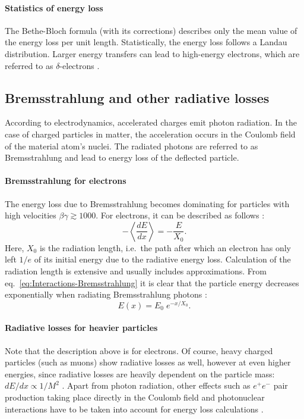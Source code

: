 \paragraph{Statistics of energy loss}
The Bethe-Bloch formula (with its corrections) describes only the mean value of the energy loss per unit length. Statistically, the energy loss follows a Landau distribution. Larger energy transfers can lead to high-energy electrons, which are referred to as $\delta$-electrons \cite{Book-KolanoskiWermes,PDG2024}.

\subsection{Bremsstrahlung and other radiative losses}
\label{sec:Interactions-Bremsstrahlung}
According to electrodynamics, accelerated charges emit photon radiation. In the case of charged particles in matter, the acceleration occurs in the Coulomb field of the material atom's nuclei. The radiated photons are referred to as Bremsstrahlung and lead to energy loss of the deflected particle.
\paragraph{Bremsstrahlung for electrons}
The energy loss due to Bremsstrahlung becomes dominating for particles with high velocities $\beta\gamma \gtrsim 1000$. For electrons, it can be described as follows \cite{Book-KolanoskiWermes,PDG2024}:
\begin{equation}
    -\left\langle \frac{dE}{dx} \right\rangle =-\frac{E}{X_0}.
    \label{eq:Interactions-Bremsstrahlung}
\end{equation}
Here, $X_0$ is the radiation length, i.e.\ the path after which an electron has only left $1/e$ of its initial energy due to the radiative energy loss. Calculation of the radiation length is extensive and usually includes approximations. From eq.\ \ref{eq:Interactions-Bremsstrahlung} it is clear that the particle energy decreases exponentially when radiating Bremsstrahlung photons \cite{Book-KolanoskiWermes}:
\begin{equation*}
    E(x)=E_0 \; e^{-x/X_0}.
\end{equation*}
\paragraph{Radiative losses for heavier particles}
Note that the description above is for electrons. Of course, heavy charged particles (such as muons) show radiative losses as well, however at even higher energies, since radiative losses are heavily dependent on the particle mass: $dE/dx \propto 1/M^2$ \cite{Book-KolanoskiWermes}. Apart from photon radiation, other effects such as $e^+e^-$ pair production taking place directly in the Coulomb field and photonuclear interactions have to be taken into account for energy loss calculations \cite{Interactions-MuonStoppingPower}.
